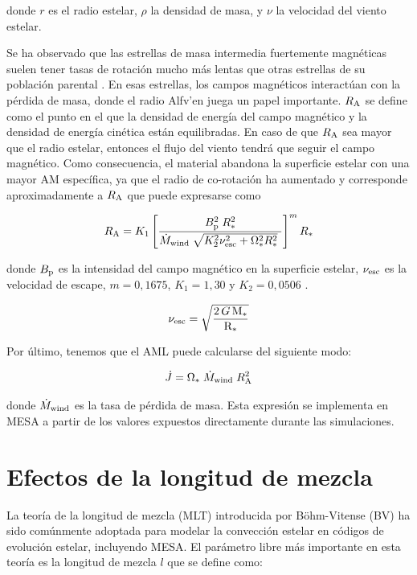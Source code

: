 donde $r$ es el radio estelar, $\rho$ la densidad de masa, y $\nu$ la velocidad del viento estelar.

Se ha observado que las estrellas de masa intermedia fuertemente magnéticas suelen tener tasas de rotación mucho más lentas que otras estrellas de su población parental \cite{Mathys2006}. En esas estrellas, los campos magnéticos interactúan con la pérdida de masa, donde el radio Alfv'{e}n juega un papel importante. $R_{\mathrm{A}}$ se define como el punto en el que la densidad de energía del campo magnético y la densidad de energía cinética están equilibradas. En caso de que $R_{\mathrm{A}}$ sea mayor que el radio estelar, entonces el flujo del viento tendrá que seguir el campo magnético. Como consecuencia, el material abandona la superficie estelar con una mayor AM específica, ya que el radio de co-rotación ha aumentado y corresponde aproximadamente a $R_{\mathrm{A}}$ que puede expresarse como \cite{Matt2012}

\begin{ceqn}
	\begin{equation}
		R_{\mathrm{A}} = K_1\left[\frac{B_{\mathrm{p}}^{2}\;R_*^{2}}{\Dot{M}_{\mathrm{wind}}\;\sqrt{K_2^2\nu_{\mathrm{esc}}^2 + \Omega_*^2R_*^{2}}\ }\right]^{m}R_*  \label{eq:mb_ralfven}
	\end{equation}
\end{ceqn}

donde $B_{\mathrm{p}}$ es la intensidad del campo magnético en la superficie estelar, $\nu_{\mathrm{esc}}$ es la velocidad de escape, $m = 0,1675$, $K_1 = 1,30$ y $K_2 = 0,0506$ \cite{Gallet2013}.

\begin{ceqn}
	\begin{equation}
		\nu_{\mathrm{esc}} = \sqrt{\frac{2\,G\,\mathrm{M}_*}{\mathrm{R}_*}} \label{eq:vesc}
	\end{equation}
\end{ceqn}

Por último, tenemos que el AML puede calcularse del siguiente modo:

\begin{ceqn}
	\begin{equation}
		\Dot{J} = \Omega_* \; \Dot{M}_{\mathrm{wind}} \; R_{\mathrm{A}}^{2} \label{eq:j_dot}
	\end{equation}
\end{ceqn}

donde $\Dot{M}_{\mathrm{wind}}$ es la tasa de pérdida de masa. Esta expresión se implementa en MESA a partir de los valores expuestos directamente durante las simulaciones.

\section{Efectos de la longitud de mezcla}
La teoría de la longitud de mezcla (MLT) introducida por Böhm-Vitense (BV) ha sido comúnmente adoptada para modelar la convección estelar en códigos de evolución estelar, incluyendo MESA. El parámetro libre más importante en esta teoría es la longitud de mezcla $l$ que se define como:

